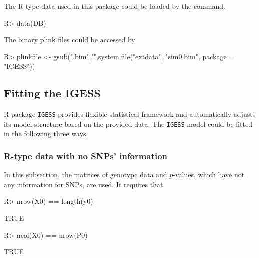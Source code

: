 \documentclass[11pt]{article}
\begin{document}
The R-type data used in this package could be loaded by the command.
\begin{Schunk}
\begin{Sinput}
R> data(DB)
\end{Sinput}
\end{Schunk}
The binary plink files could be accessed by
\begin{Schunk}
\begin{Sinput}
R> plinkfile <- gsub(".bim","",system.file("extdata", "sim0.bim", package = "IGESS"))
\end{Sinput}
\end{Schunk}

\subsection{Fitting the IGESS}\label{fitting}

R package \texttt{IGESS} provides flexible statistical framework
and automatically adjusts its model structure based on the provided data.
The \texttt{IGESS} model could be fitted in the following three ways.


\subsubsection{R-type data with no SNPs' information}
In this subsection, the matrices of genotype data and $p$-values, which have not any information for SNPs, are used. It requires that
\begin{Schunk}
\begin{Sinput}
R> nrow(X0) == length(y0)
\end{Sinput}
\begin{Soutput}
[1] TRUE
\end{Soutput}
\begin{Sinput}
R> ncol(X0) == nrow(P0)
\end{Sinput}
\begin{Soutput}
[1] TRUE
\end{Soutput}
\end{Schunk}
\end{document}
